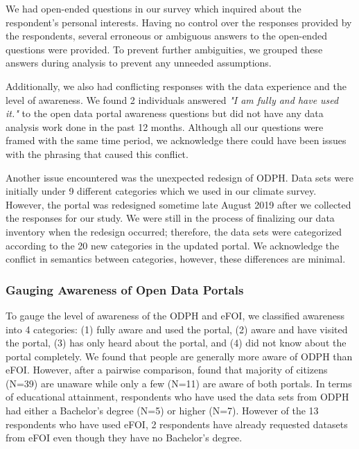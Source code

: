 \documentclass{sigchi}
\begin{document}
We had open-ended questions in our survey which inquired about the respondent's personal interests. Having no control over the responses provided by the respondents, several erroneous or ambiguous answers to the open-ended questions were provided. To prevent further ambiguities, we grouped these answers during analysis to prevent any unneeded assumptions.

Additionally, we also had conflicting responses with the data experience and the level of awareness. We found 2 individuals answered \textit{"I am fully and have used it."} to the open data portal awareness questions but did not have any data analysis work done in the past 12 months. Although all our questions were framed with the same time period, we acknowledge there could have been issues with the phrasing that caused this conflict.

Another issue encountered was the unexpected redesign of ODPH. Data sets were initially under 9 different categories which we used in our climate survey. However, the portal was redesigned sometime late August 2019 after we collected the responses for our study. We were still in the process of finalizing our data inventory when the redesign occurred; therefore, the data sets were categorized according to the 20 new categories in the updated portal. We acknowledge the conflict in semantics between categories, however, these differences are minimal.

\subsubsection{Gauging Awareness of Open Data Portals}
To gauge the level of awareness of the ODPH and eFOI, we classified awareness into 4 categories: (1) fully aware and used the portal, (2) aware and have visited the portal, (3) has only heard about the portal, and (4) did not know about the portal completely. We found that people are generally more aware of ODPH than eFOI. However, after a pairwise comparison, found that majority of citizens (N=39) are unaware while only a few (N=11) are aware of both portals. In terms of educational attainment, respondents who have used the data sets from ODPH had either a Bachelor's degree (N=5) or higher (N=7). However of the 13 respondents who have used eFOI, 2 respondents have already requested datasets from eFOI even though they have no Bachelor's degree. 
\end{document}
